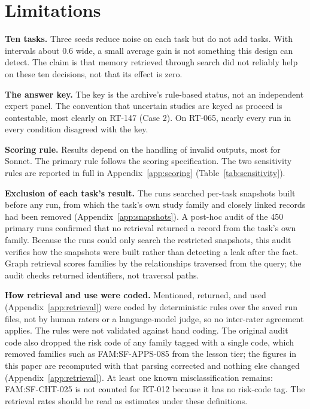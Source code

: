 \documentclass[11pt]{article}
\begin{document}
\section{Limitations}
\label{sec:limits}

\textbf{Ten tasks.} Three seeds reduce noise on each task but do not add tasks. With intervals about 0.6 wide, a small average gain is not something this design can detect. The claim is that memory retrieved through search did not reliably help on these ten decisions, not that its effect is zero.

\textbf{The answer key.} The key is the archive's rule-based status, not an independent expert panel. The convention that uncertain studies are keyed as proceed is contestable, most clearly on RT-147 (Case 2). On RT-065, nearly every run in every condition disagreed with the key.

\textbf{Scoring rule.} Results depend on the handling of invalid outputs, most for Sonnet. The primary rule follows the scoring specification. The two sensitivity rules are reported in full in Appendix~\ref{app:scoring} (Table~\ref{tab:sensitivity}).

\textbf{Exclusion of each task's result.} The runs searched per-task snapshots built before any run, from which the task's own study family and closely linked records had been removed (Appendix~\ref{app:snapshots}). A post-hoc audit of the 450 primary runs confirmed that no retrieval returned a record from the task's own family. Because the runs could only search the restricted snapshots, this audit verifies how the snapshots were built rather than detecting a leak after the fact. Graph retrieval scores families by the relationships traversed from the query; the audit checks returned identifiers, not traversal paths.

\textbf{How retrieval and use were coded.} Mentioned, returned, and used (Appendix~\ref{app:retrieval}) were coded by deterministic rules over the saved run files, not by human raters or a language-model judge, so no inter-rater agreement applies. The rules were not validated against hand coding. The original audit code also dropped the risk code of any family tagged with a single code, which removed families such as FAM:SF-APPS-085 from the lesson tier; the figures in this paper are recomputed with that parsing corrected and nothing else changed (Appendix~\ref{app:retrieval}). At least one known misclassification remains: FAM:SF-CHT-025 is not counted for RT-012 because it has no risk-code tag. The retrieval rates should be read as estimates under these definitions.
\end{document}
